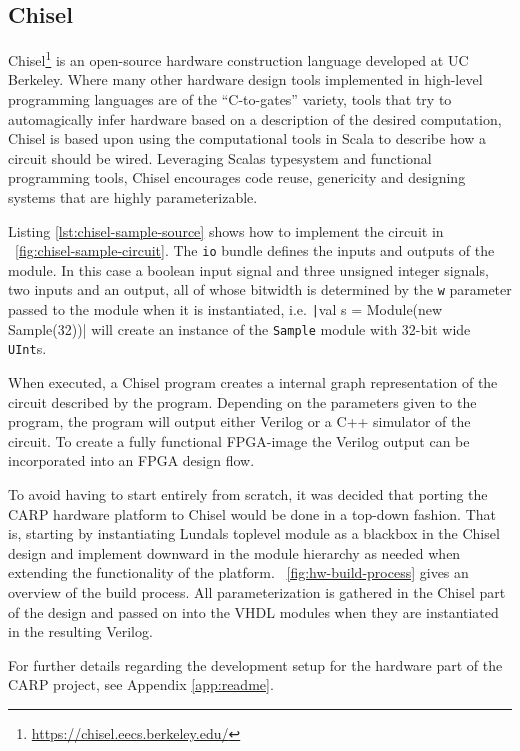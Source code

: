 \subsection{Chisel}
\label{sec:chisel}

Chisel\footnote{\url{https://chisel.eecs.berkeley.edu/}} is an open-source
hardware construction language developed at UC Berkeley. Where many other
hardware design tools implemented in high-level programming languages are of the
``C-to-gates'' variety, tools that try to automagically infer hardware based on
a description of the desired computation, Chisel is based upon using the
computational tools in Scala to describe how a circuit should be wired.
Leveraging Scalas typesystem and functional programming tools, Chisel encourages
code reuse, genericity and designing systems that are highly parameterizable.

Listing \ref{lst:chisel-sample-source} shows how to implement the circuit in
\figurename~\ref{fig:chisel-sample-circuit}. The \texttt{io} bundle defines the inputs
and outputs of the module. In this case a boolean input signal and three
unsigned integer signals, two inputs and an output, all of whose bitwidth is
determined by the \texttt{w} parameter passed to the module when it is
instantiated, i.e. \texttt|val s = Module(new Sample(32))| will
create an instance of the \texttt{Sample} module with 32-bit wide
\texttt{UInt}s.

When executed, a Chisel program creates a internal graph representation of the
circuit described by the program. Depending on the parameters given to the
program, the program will output either Verilog or a C++ simulator of the
circuit. To create a fully functional FPGA-image the Verilog output can be
incorporated into an FPGA design flow.

To avoid having to start entirely from scratch, it was decided that porting the
CARP hardware platform to Chisel would be done in a top-down fashion. That is,
starting by instantiating Lundals toplevel module as a blackbox in the Chisel
design and implement downward in the module hierarchy as needed when extending
the functionality of the platform. \figurename~\ref{fig:hw-build-process} gives
an overview of the build process. All parameterization is gathered in the Chisel
part of the design and passed on into the VHDL modules when they are
instantiated in the resulting Verilog.

For further details regarding the development setup for the hardware part of the
CARP project, see Appendix \ref{app:readme}.

